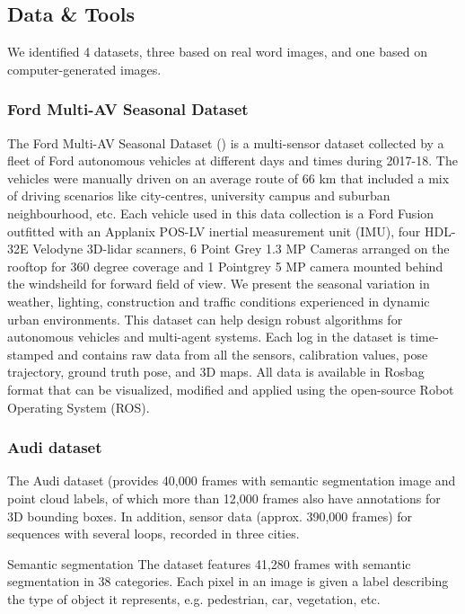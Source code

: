 \subsection{Data \& Tools}

We identified 4 datasets, three based on real word images, and one based on computer-generated images.

\subsubsection{Ford Multi-AV Seasonal Dataset}
The Ford Multi-AV Seasonal Dataset (\cite{agarwal2020ford}) is a multi-sensor dataset collected by a fleet of Ford autonomous vehicles at different days and times during 2017-18. The vehicles were manually driven on an average route of 66 km that included a mix of driving scenarios like city-centres, university campus and suburban neighbourhood, etc. Each vehicle used in this data collection is a Ford Fusion outfitted with an Applanix POS-LV inertial measurement unit (IMU), four HDL-32E Velodyne 3D-lidar scanners, 6 Point Grey 1.3 MP Cameras arranged on the rooftop for 360 degree coverage and 1 Pointgrey 5 MP camera mounted behind the windsheild for forward field of view. We present the seasonal variation in weather, lighting, construction and traffic conditions experienced in dynamic urban environments. This dataset can help design robust algorithms for autonomous vehicles and multi-agent systems. Each log in the dataset is time-stamped and contains raw data from all the sensors, calibration values, pose trajectory, ground truth pose, and 3D maps. All data is available in Rosbag format that can be visualized, modified and applied using the open-source Robot Operating System (ROS).

\subsubsection{Audi dataset}

The Audi dataset (\cite{(Audi 2019)}provides 40,000 frames with semantic segmentation image and point cloud labels, of which more than 12,000 frames also have annotations for 3D bounding boxes. In addition, sensor data (approx. 390,000 frames) for sequences with several loops, recorded in three cities.

Semantic segmentation
The dataset features 41,280 frames with semantic segmentation in 38 categories. Each pixel in an image is given a label describing the type of object it represents, e.g. pedestrian, car, vegetation, etc.

